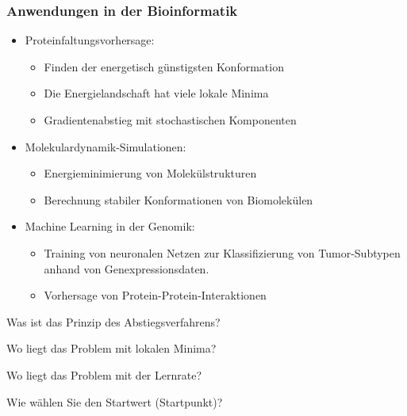 \begin{frame}
    \frametitle{Anwendungen in der Bioinformatik}

    \begin{itemize}
        \item Proteinfaltungsvorhersage:
        \begin{itemize}
        \item Finden der energetisch günstigsten Konformation
        \item Die Energielandschaft hat viele lokale Minima
        \item Gradientenabstieg mit stochastischen Komponenten
        \end{itemize}
         \item Molekulardynamik-Simulationen:\
        \begin{itemize}
            \item Energieminimierung von Molekülstrukturen
            \item Berechnung stabiler Konformationen von Biomolekülen
        \end{itemize}        
        \item Machine Learning in der Genomik:
        \begin{itemize}
        \item Training von neuronalen Netzen zur Klassifizierung von Tumor-Subtypen anhand von Genexpressionsdaten.
        \item Vorhersage von Protein-Protein-Interaktionen
        \end{itemize}
    \end{itemize}
\end{frame}

\begin{Abschluss}
\item Was ist das Prinzip des Abstiegsverfahrens?
\item Wo liegt das Problem mit lokalen Minima?
\item Wo liegt das Problem mit der Lernrate?
\item Wie wählen Sie den Startwert (Startpunkt)?
\end{Abschluss}


